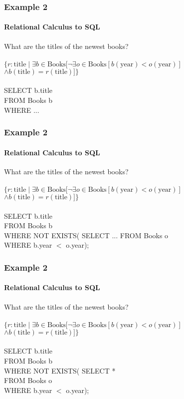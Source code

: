 \documentclass{beamer}
\begin{document}
\begin{frame}
  \frametitle{Example 2}
    \framesubtitle{Relational Calculus to SQL}
  What are the titles of the newest books?\\
  \hfill \\
  $\{r:\text{title} \mid \exists b \in \text{Books} [ \neg\exists o \in \text{Books} [ b(\text{year}) < o(\text{year})]$\\
  $\land b(\text{title}) = r(\text{title})] \}$\\
  \hfill \\
  SELECT b.title\\
  FROM Books b\\
  WHERE ...
\end{frame}
\begin{frame}
  \frametitle{Example 2}
    \framesubtitle{Relational Calculus to SQL}
  What are the titles of the newest books?\\
  \hfill \\
  $\{r:\text{title} \mid \exists b \in \text{Books} [ \neg\exists o \in \text{Books} [ b(\text{year}) < o(\text{year})]$\\
  $\land b(\text{title}) = r(\text{title})] \}$\\
  \hfill \\
  SELECT b.title\\
  FROM Books b\\
  WHERE NOT EXISTS( SELECT ...
  FROM Books o \\
  WHERE b.year $<$ o.year);
\end{frame}
\begin{frame}
  \frametitle{Example 2}
    \framesubtitle{Relational Calculus to SQL}
  What are the titles of the newest books?\\
  \hfill \\
  $\{r:\text{title} \mid \exists b \in \text{Books} [ \neg\exists o \in \text{Books} [ b(\text{year}) < o(\text{year})]$\\
  $\land b(\text{title}) = r(\text{title})] \}$\\
  \hfill \\
  SELECT b.title\\
  FROM Books b\\
  WHERE NOT EXISTS( SELECT *\\
  FROM Books o\\
  WHERE b.year $<$ o.year);
\end{frame}
\end{document}
